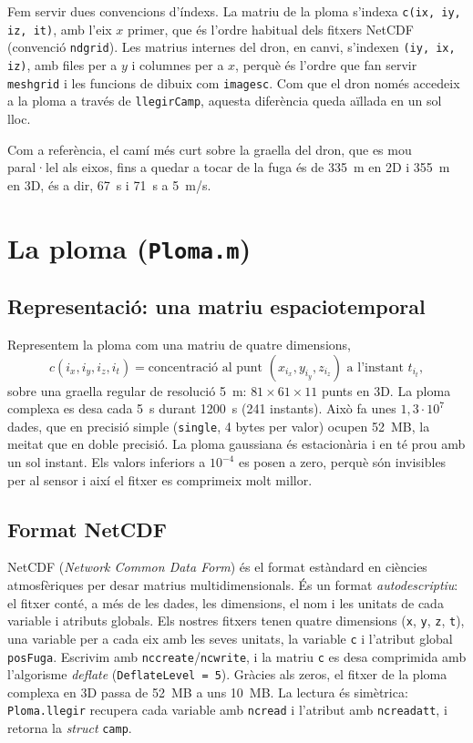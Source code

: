 \documentclass[11pt,a4paper]{article}
\begin{document}
Fem servir dues convencions d'índexs. La matriu de la ploma s'indexa \texttt{c(ix, iy, iz, it)}, amb l'eix $x$ primer, que és l'ordre habitual dels fitxers NetCDF (convenció \texttt{ndgrid}). Les matrius internes del dron, en canvi, s'indexen \texttt{(iy, ix, iz)}, amb files per a $y$ i columnes per a $x$, perquè és l'ordre que fan servir \texttt{meshgrid} i les funcions de dibuix com \texttt{imagesc}. Com que el dron només accedeix a la ploma a través de \texttt{llegirCamp}, aquesta diferència queda aïllada en un sol lloc.

Com a referència, el camí més curt sobre la graella del dron, que es mou paral·lel als eixos, fins a quedar a tocar de la fuga és de 335~m en 2D i 355~m en 3D, és a dir, 67~s i 71~s a 5~m/s.

\section{La ploma (\texttt{Ploma.m})}

\subsection{Representació: una matriu espaciotemporal}

Representem la ploma com una matriu de quatre dimensions,
\begin{equation}
c(i_x, i_y, i_z, i_t) = \text{concentració al punt } (x_{i_x}, y_{i_y}, z_{i_z}) \text{ a l'instant } t_{i_t},
\end{equation}
sobre una graella regular de resolució 5~m: $81 \times 61 \times 11$ punts en 3D. La ploma complexa es desa cada 5~s durant 1200~s (241 instants). Això fa unes $1{,}3 \cdot 10^7$ dades, que en precisió simple (\texttt{single}, 4 bytes per valor) ocupen 52~MB, la meitat que en doble precisió. La ploma gaussiana és estacionària i en té prou amb un sol instant. Els valors inferiors a $10^{-4}$ es posen a zero, perquè són invisibles per al sensor i així el fitxer es comprimeix molt millor.

\subsection{Format NetCDF}

NetCDF (\emph{Network Common Data Form}) és el format estàndard en ciències atmosfèriques per desar matrius multidimensionals. És un format \emph{autodescriptiu}: el fitxer conté, a més de les dades, les dimensions, el nom i les unitats de cada variable i atributs globals. Els nostres fitxers tenen quatre dimensions (\texttt{x}, \texttt{y}, \texttt{z}, \texttt{t}), una variable per a cada eix amb les seves unitats, la variable \texttt{c} i l'atribut global \texttt{posFuga}. Escrivim amb \texttt{nccreate}/\texttt{ncwrite}, i la matriu \texttt{c} es desa comprimida amb l'algorisme \emph{deflate} (\texttt{DeflateLevel = 5}). Gràcies als zeros, el fitxer de la ploma complexa en 3D passa de 52~MB a uns 10~MB. La lectura és simètrica: \texttt{Ploma.llegir} recupera cada variable amb \texttt{ncread} i l'atribut amb \texttt{ncreadatt}, i retorna la \emph{struct} \texttt{camp}.
\end{document}
